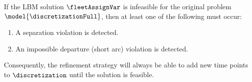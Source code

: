 \begin{theorem}
If the LBM solution $\fleetAssignVar$ is infeasible for the original problem $\model{\discretizationFull}$, then at least one of the following must occur:
\begin{enumerate}
    \item A separation violation is detected.
    \item An impossible departure (short arc) violation is detected.
\end{enumerate}
Consequently, the refinement strategy will always be able to add new time points to $\discretization$ until the solution is feasible.
\label{thm:refinement_correctness}
\end{theorem}

